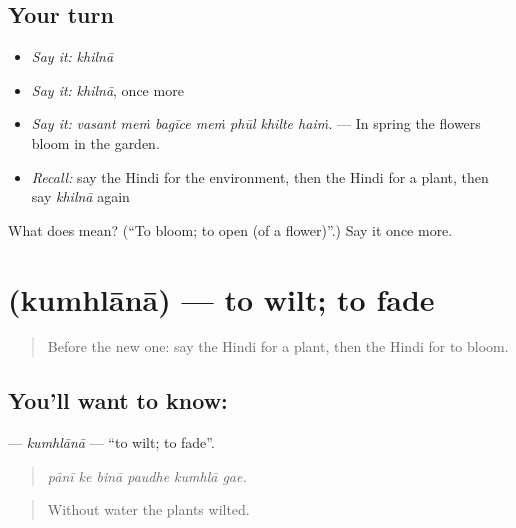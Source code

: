 \subsection*{Your turn}
\begin{itemize}
\raggedright
  \item \emph{Say it:} \emph{khilnā}
  \item \emph{Say it:} \emph{khilnā}, once more
  \item \emph{Say it:} \emph{vasant meṁ bagīce meṁ phūl khilte haiṁ.} — In spring the flowers bloom in the garden.
  \item \emph{Recall:} say the Hindi for the environment, then the Hindi for a plant, then say \emph{khilnā} again
\end{itemize}

\begin{tcolorbox}[breakable,colback=teal!4,colframe=teal!35!black,title={Before you move on}]
What does  mean? (\textquotedblleft{}To bloom; to open (of a flower)\textquotedblright{}.) Say it once more.
\end{tcolorbox}
\section[\texorpdfstring{\hi{कुम्हलाना} (kumhlānā)}{कुम्हलाना (kumhlānā)}]{ (kumhlānā) — to wilt; to fade}

\label{lesson:HI-C446-kumhlana}



\begin{quote}
Before the new one: say the Hindi for a plant, then the Hindi for to bloom.
\end{quote}

\subsection*{You'll want to know: }
\textbf{} — \emph{kumhlānā} — \textquotedblleft{}to wilt; to fade\textquotedblright{}.

\begin{quote}
     
\end{quote}

\begin{quote}
\emph{pānī ke binā paudhe kumhlā gae.}
\end{quote}

\begin{quote}
Without water the plants wilted.
\end{quote}


